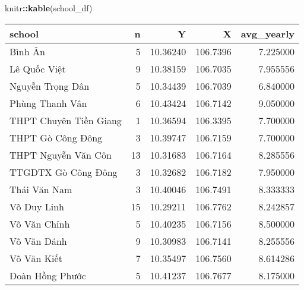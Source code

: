 \documentclass[
]{article}
\newenvironment{Shaded}{\begin{snugshade}}{\end{snugshade}}
\newcommand{\FunctionTok}[1]{\textcolor[rgb]{0.13,0.29,0.53}{\textbf{#1}}}
\newcommand{\NormalTok}[1]{#1}
\newcommand{\SpecialCharTok}[1]{\textcolor[rgb]{0.81,0.36,0.00}{\textbf{#1}}}
\begin{document}
\begin{Shaded}
\begin{Highlighting}[]
\NormalTok{knitr}\SpecialCharTok{::}\FunctionTok{kable}\NormalTok{(school\_df)}
\end{Highlighting}
\end{Shaded}

\begin{longtable}[]{@{}lrrrr@{}}
\toprule\noalign{}
school & n & Y & X & avg\_yearly \\
\midrule\noalign{}
\endhead
\bottomrule\noalign{}
\endlastfoot
Bình Ân & 5 & 10.36240 & 106.7396 & 7.225000 \\
Lê Quốc Việt & 9 & 10.38159 & 106.7035 & 7.955556 \\
Nguyễn Trọng Dân & 5 & 10.34439 & 106.7039 & 6.840000 \\
Phùng Thanh Vân & 6 & 10.43424 & 106.7142 & 9.050000 \\
THPT Chuyên Tiền Giang & 1 & 10.36594 & 106.3395 & 7.700000 \\
THPT Gò Công Đông & 3 & 10.39747 & 106.7159 & 7.700000 \\
THPT Nguyễn Văn Côn & 13 & 10.31683 & 106.7164 & 8.285556 \\
TTGDTX Gò Công Đông & 3 & 10.32682 & 106.7182 & 7.950000 \\
Thái Văn Nam & 3 & 10.40046 & 106.7491 & 8.333333 \\
Võ Duy Linh & 15 & 10.29211 & 106.7762 & 8.242857 \\
Võ Văn Chỉnh & 5 & 10.40235 & 106.7156 & 8.500000 \\
Võ Văn Dánh & 9 & 10.30983 & 106.7141 & 8.255556 \\
Võ Văn Kiết & 7 & 10.35497 & 106.7560 & 8.614286 \\
Đoàn Hồng Phước & 5 & 10.41237 & 106.7677 & 8.175000 \\
\end{longtable}
\end{document}
